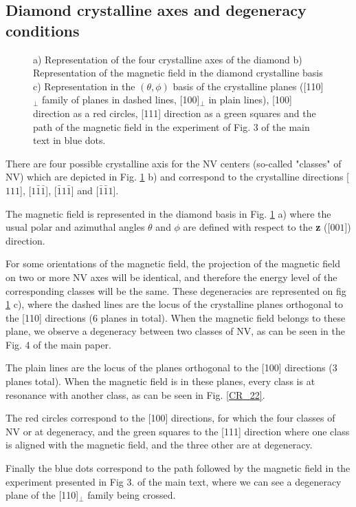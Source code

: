 \documentclass[preprintnumbers,amsmath,amssymb,onecolumn,12pt]{revtex4}
\begin{document}
\subsection{Diamond crystalline axes and degeneracy conditions}
\begin{figure}[!ht]
  \centering {}
  \caption{a) Representation of the four crystalline axes of the diamond b) Representation of the magnetic field in the diamond crystalline basis c) Representation in the $(\theta , \phi)$ basis of the crystalline planes ([110]$_\perp$ family of planes in dashed lines, [100]$_\perp$ in plain lines), [100] direction as a red circles, [111] direction as a green squares and the path of the magnetic field in the experiment of Fig. 3 of the main text in blue dots.}
	\label{cristallo}
\end{figure}
There are four possible crystalline axis for the NV centers (so-called "classes" of NV) which are depicted in Fig. \ref{cristallo} b) and correspond to the crystalline directions [$111$], [$1\bar 1 \bar 1$], [$\bar 1 1 \bar 1$] and [$\bar 1 \bar 1 1$]. 

The magnetic field is represented in the diamond basis in Fig. \ref{cristallo} a) where the usual polar and azimuthal angles $\theta$ and $\phi$ are defined with respect to the \textbf{z} ([$001$]) direction.

For some orientations of the magnetic field, the projection of the magnetic field on two or more NV axes will be identical, and therefore the energy level of the corresponding classes will be the same. These degeneracies are represented on fig \ref{cristallo} c), where the dashed lines are the locus of the crystalline planes orthogonal to the [110] directions (6 planes in total). When the magnetic field belongs to these plane, we observe a degeneracy between two classes of NV, as can be seen in the Fig. 4 of the main paper.

The plain lines are the locus of the planes orthogonal to the [100] directions (3 planes total). When the magnetic field is in these planes, every class is at resonance with another class, as can be seen in Fig. \ref{CR_22}.

The red circles correspond to the [100] directions, for which the four classes of NV or at degeneracy, and the green squares to the [111] direction where one class is aligned with the magnetic field, and the three other are at degeneracy.

Finally the blue dots correspond to the path followed by the magnetic field in the experiment presented in Fig 3. of the main text, where we can see a degeneracy plane of the [110]$_\perp$ family being crossed.
\end{document}
